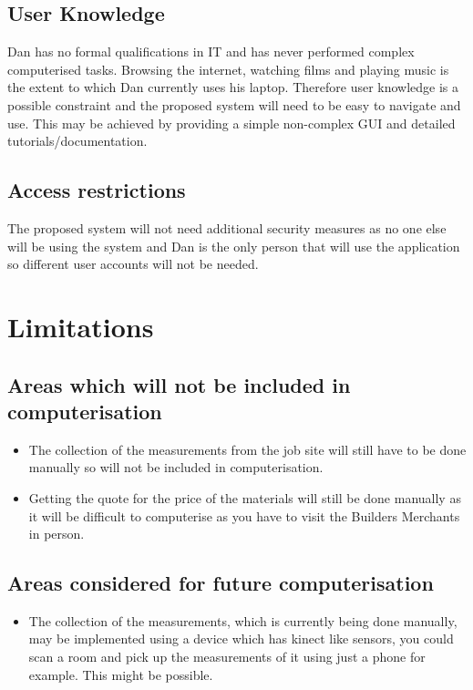 \subsection{User Knowledge}

\begin{flushleft}
	Dan has no formal qualifications in IT and has never performed complex computerised tasks. Browsing the internet, watching films and playing music is the extent to which Dan currently uses his laptop. Therefore user knowledge is a possible constraint and the proposed system will need to be easy to navigate and use. This may be achieved by providing a simple non-complex GUI and detailed tutorials/documentation.
\end{flushleft}

\subsection{Access restrictions}

\begin{flushleft}

	The proposed system will not need additional security measures as no one else will be using the system and Dan is the only person that will use the application so different user accounts will not be needed. 

\end{flushleft}

\section{Limitations}

\subsection{Areas which will not be included in computerisation}

	\begin{itemize}
		\item The collection of the measurements from the job site will still have to be done manually so will not be included in computerisation.
		\item Getting the quote for the price of the materials will still be done manually as it will be difficult to computerise as you have to visit the Builders Merchants in person.
	\end{itemize}

\subsection{Areas considered for future computerisation}
	\begin{itemize}
		\item The collection of the measurements, which is currently being done manually, may be implemented using a device which has kinect like sensors, you could scan a room and pick up the measurements of it using just a phone for example. This might be possible.
	\end{itemize}

